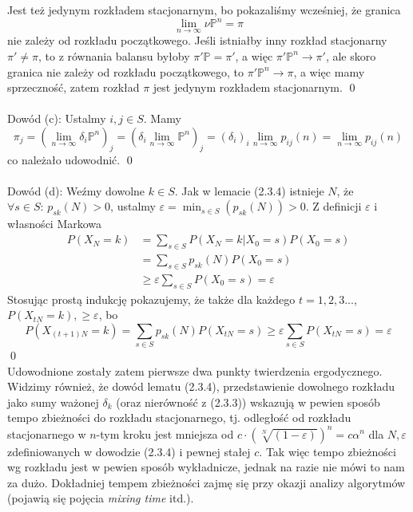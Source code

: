 \documentclass[a4paper]{article}
\begin{document}
Jest też jedynym rozkładem stacjonarnym, bo pokazaliśmy wcześniej, że granica $$\lim\limits_{n \to \infty} \nu\mathbb{P}^n = \pi$$ nie zależy od rozkładu początkowego. Jeśli istniałby inny rozkład stacjonarny $\pi' \neq \pi$, to z równania balansu byłoby $\pi'\mathbb{P} = \pi'$, a więc $\pi'\mathbb{P}^n \to \pi'$, ale skoro granica nie zależy od rozkładu początkowego, to $\pi'\mathbb{P}^n \to \pi$, a więc mamy sprzeczność, zatem rozkład $\pi$ jest jedynym rozkładem stacjonarnym. \qed\\\\
Dowód (c): Ustalmy $i,j \in S$. Mamy $$\pi_j = (\lim\limits_{n \to \infty} \delta_i\mathbb{P}^n)_j = (\delta_i \lim\limits_{n \to \infty} \mathbb{P}^n)_j = (\delta_i)_i \lim\limits_{n \to \infty} p_{ij}(n) = \lim\limits_{n \to \infty} p_{ij}(n)$$ co należało udowodnić. \qed\\\\
Dowód (d): Weźmy dowolne $k \in S$. Jak w lemacie (2.3.4) istnieje $N$, że $\forall s \in S:\, p_{sk}(N) > 0$, ustalmy $\varepsilon = \min_{s \in S}(p_{sk}(N)) > 0$. Z definicji $\varepsilon$ i własności Markowa
\begin{align*}
P(X_N = k) &= \sum\limits_{s \in S} P(X_N = k|X_0 = s)P(X_0 = s) \\
&= \sum\limits_{s \in S} p_{sk}(N)P(X_0 = s) \\
&\geq \varepsilon \sum\limits_{s \in S} P(X_0 = s) = \varepsilon
\end{align*}
Stosując prostą indukcję pokazujemy, że także dla każdego $t = 1,2,3...$, $P(X_{tN} = k), \geq \varepsilon$, bo
$$P(X_{(t+1)N} = k) = \sum\limits_{s \in S} p_{sk}(N)P(X_{tN} = s) \geq \varepsilon \sum\limits_{s \in S} P(X_{tN} = s) = \varepsilon$$
\qed
\\ Udowodnione zostały zatem pierwsze dwa punkty twierdzenia ergodycznego. Widzimy również, że dowód lematu (2.3.4), przedstawienie dowolnego rozkładu jako sumy ważonej $\delta_k$ (oraz nierówność z (2.3.3)) wskazują w pewien sposób tempo zbieżności do rozkładu stacjonarnego, tj. odległość od rozkładu stacjonarnego w $n$-tym kroku jest mniejsza od $c \cdot (\sqrt[N]{(1-\varepsilon)})^n = c\alpha^n$ dla $N, \varepsilon$ zdefiniowanych w dowodzie (2.3.4) i pewnej stałej $c$. Tak więc tempo zbieżności wg rozkładu jest w pewien sposób wykładnicze, jednak na razie nie mówi to nam za dużo. Dokładniej tempem zbieżności zajmę się przy okazji analizy algorytmów (pojawią się pojęcia \textit{mixing time} itd.).
\\\\
\end{document}
